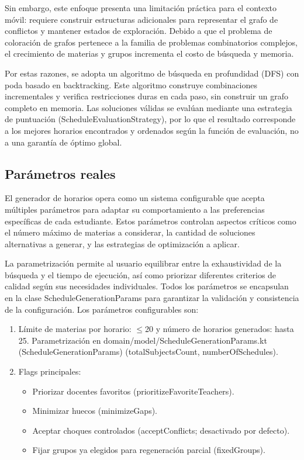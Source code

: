 Sin embargo, este enfoque presenta una limitación práctica para el contexto móvil: requiere construir estructuras adicionales para representar el grafo de conflictos y mantener estados de exploración. Debido a que el problema de coloración de grafos pertenece a la familia de problemas combinatorios complejos, el crecimiento de materias y grupos incrementa el costo de búsqueda y memoria.

Por estas razones, se adopta un algoritmo de búsqueda en profundidad (DFS) con poda basado en backtracking. Este algoritmo construye combinaciones incrementales y verifica restricciones duras en cada paso, sin construir un grafo completo en memoria. Las soluciones válidas se evalúan mediante una estrategia de puntuación (ScheduleEvaluationStrategy), por lo que el resultado corresponde a los mejores horarios encontrados y ordenados según la función de evaluación, no a una garantía de óptimo global.

\subsection{Parámetros reales}
El generador de horarios opera como un sistema configurable que acepta múltiples parámetros para adaptar su comportamiento a las preferencias específicas de cada estudiante. Estos parámetros controlan aspectos críticos como el número máximo de materias a considerar, la cantidad de soluciones alternativas a generar, y las estrategias de optimización a aplicar.

La parametrización permite al usuario equilibrar entre la exhaustividad de la búsqueda y el tiempo de ejecución, así como priorizar diferentes criterios de calidad según sus necesidades individuales. Todos los parámetros se encapsulan en la clase ScheduleGenerationParams para garantizar la validación y consistencia de la configuración. Los parámetros configurables son:

\begin{enumerate}
  \item Límite de materias por horario: \(\leq\)20 y número de horarios generados: hasta 25. Parametrización en domain/model/ScheduleGenerationParams.kt (ScheduleGenerationParams) (totalSubjectsCount, numberOfSchedules).
  \item Flags principales:
    \begin{itemize}
      \item Priorizar docentes favoritos (prioritizeFavoriteTeachers).
      \item Minimizar huecos (minimizeGaps).
      \item Aceptar choques controlados (acceptConflicts; desactivado por defecto).
      \item Fijar grupos ya elegidos para regeneración parcial (fixedGroups).
    \end{itemize}
\end{enumerate}

